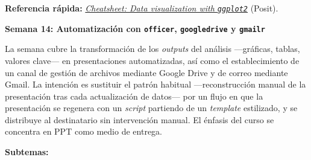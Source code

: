 \documentclass[11pt,letterpaper]{article}
\newcommand{\semana}[2]{%
  \bigskip%
  {\color{main}\Large\bfseries Semana #1: #2\par}%
  \smallskip%
}
\newcommand{\cheatsheet}[2]{%
  \href{https://rstudio.github.io/cheatsheets/#1.pdf}{\textit{Cheatsheet: #2}}%
}
\begin{document}
\medskip
\noindent\textbf{Referencia rápida:} \cheatsheet{data-visualization}{Data visualization with \texttt{ggplot2}} (Posit).

\semana{14}{Automatización con \texttt{officer}, \texttt{googledrive} y \texttt{gmailr}}

La semana cubre la transformación de los \textit{outputs} del análisis ---gráficas, tablas, valores clave--- en presentaciones automatizadas, así como el establecimiento de un canal de gestión de archivos mediante Google Drive y de correo mediante Gmail. La intención es sustituir el patrón habitual ---reconstrucción manual de la presentación tras cada actualización de datos--- por un flujo en que la presentación se regenera con un \textit{script} partiendo de un \textit{template} estilizado, y se distribuye al destinatario sin intervención manual. El énfasis del curso se concentra en PPT como medio de entrega.

\textbf{Subtemas:}
\end{document}
